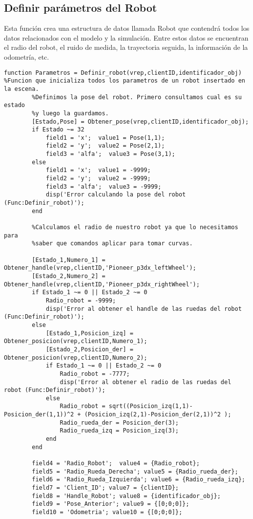 \subsection{Definir parámetros del Robot}
Esta función crea una estructura de datos llamada Robot que contendrá todos los datos relacionados con el modelo y la simulación.
Entre estos datos se encuentran el radio del robot, el ruido de medida, la trayectoria seguida, la información de la odometría, etc.
\begin{lstlisting}[frame=single]
 function Parametros = Definir_robot(vrep,clientID,identificador_obj) %Funcion que inicializa todos los parametros de un robot insertado en la escena.
        %Definimos la pose del robot. Primero consultamos cual es su estado
        %y luego la guardamos.
        [Estado,Pose] = Obtener_pose(vrep,clientID,identificador_obj);
        if Estado ~= 32
            field1 = 'x';  value1 = Pose(1,1);
            field2 = 'y';  value2 = Pose(2,1);
            field3 = 'alfa';  value3 = Pose(3,1);
        else 
            field1 = 'x';  value1 = -9999;
            field2 = 'y';  value2 = -9999;
            field3 = 'alfa';  value3 = -9999;
            disp('Error calculando la pose del robot (Func:Definir_robot)');
        end
        
        %Calculamos el radio de nuestro robot ya que lo necesitamos para
        %saber que comandos aplicar para tomar curvas.
        
        [Estado_1,Numero_1] = Obtener_handle(vrep,clientID,'Pioneer_p3dx_leftWheel');
        [Estado_2,Numero_2] = Obtener_handle(vrep,clientID,'Pioneer_p3dx_rightWheel');
        if Estado_1 ~= 0 || Estado_2 ~= 0 
            Radio_robot = -9999;
            disp('Error al obtener el handle de las ruedas del robot (Func:Definir_robot)');
        else
            [Estado_1,Posicion_izq] = Obtener_posicion(vrep,clientID,Numero_1);
            [Estado_2,Posicion_der] = Obtener_posicion(vrep,clientID,Numero_2);
            if Estado_1 ~= 0 || Estado_2 ~= 0 
                Radio_robot = -7777; 
                disp('Error al obtener el radio de las ruedas del robot (Func:Definir_robot)');
            else
                Radio_robot = sqrt((Posicion_izq(1,1)-Posicion_der(1,1))^2 + (Posicion_izq(2,1)-Posicion_der(2,1))^2 );
                Radio_rueda_der = Posicion_der(3);
                Radio_rueda_izq = Posicion_izq(3);
            end
        end
        
        field4 = 'Radio_Robot';  value4 = {Radio_robot};
        field5 = 'Radio_Rueda_Derecha'; value5 = {Radio_rueda_der};
        field6 = 'Radio_Rueda_Izquierda'; value6 = {Radio_rueda_izq};
        field7 = 'Client_ID'; value7 = {clientID};
        field8 = 'Handle_Robot'; value8 = {identificador_obj};
        field9 = 'Pose_Anterior'; value9 = {[0;0;0]};
        field10 = 'Odometria'; value10 = {[0;0;0]};
        

\end{lstlisting}
